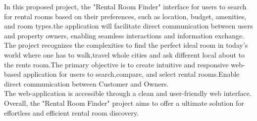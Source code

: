 In this proposed project, the "Rental Room Finder" interface for users to search for rental rooms based on their preferences, such as location, budget, amenities, and room types.the application will facilitate direct communication between users and property owners, enabling seamless interactions and information exchange.\\
The project recognizes the complexities to find the perfect ideal room in today's world where one has to walk,travel whole cities and ask different local about to the rents room.The primary objective is to create intuitive and responsive web-based application for users to search,compare, and select rental rooms.Enable direct communication between Customer and Owners.\\
The web-application is  accessible through a clean and user-friendly web interface. Overall, the "Rental Room Finder" project aims to offer a ultimate solution for effortless and efficient rental room discovery.
